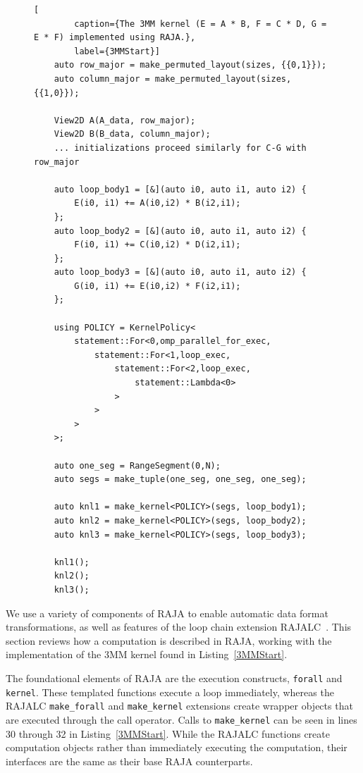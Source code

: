 \documentclass[sigconf,review=true]{acmart}
\begin{document}
\begin{figure}
	\begin{lstlisting}[
		caption={The 3MM kernel (E = A * B, F = C * D, G = E * F) implemented using RAJA.},
		label={3MMStart}]
	auto row_major = make_permuted_layout(sizes, {{0,1}});
	auto column_major = make_permuted_layout(sizes, {{1,0}});

	View2D A(A_data, row_major);
	View2D B(B_data, column_major);
	... initializations proceed similarly for C-G with row_major

	auto loop_body1 = [&](auto i0, auto i1, auto i2) {
		E(i0, i1) += A(i0,i2) * B(i2,i1);
	};
	auto loop_body2 = [&](auto i0, auto i1, auto i2) {
		F(i0, i1) += C(i0,i2) * D(i2,i1);
	};
	auto loop_body3 = [&](auto i0, auto i1, auto i2) {
		G(i0, i1) += E(i0,i2) * F(i2,i1);
	};
	
	using POLICY = KernelPolicy<
		statement::For<0,omp_parallel_for_exec,
			statement::For<1,loop_exec,
				statement::For<2,loop_exec,
					statement::Lambda<0>
				>
			>
		>
	>;

	auto one_seg = RangeSegment(0,N);
	auto segs = make_tuple(one_seg, one_seg, one_seg);

	auto knl1 = make_kernel<POLICY>(segs, loop_body1);
	auto knl2 = make_kernel<POLICY>(segs, loop_body2);
	auto knl3 = make_kernel<POLICY>(segs, loop_body3);

	knl1();
	knl2();
	knl3();
	\end{lstlisting}
\end{figure}


We use a variety of components of RAJA to enable automatic data format transformations, as well as features of the loop chain extension RAJALC~\cite{neth2021inter}. 
This section reviews how a computation is described in RAJA, working with the implementation of the 3MM kernel found in Listing~\ref{3MMStart}.

The foundational elements of RAJA are the execution constructs, \verb.forall. and \verb.kernel.. 
These templated functions execute a loop immediately, whereas the RAJALC \verb.make_forall. and \verb.make_kernel. extensions create wrapper objects that are executed through the call operator. 
Calls to \verb.make_kernel. can be seen in lines 30 through 32 in Listing~\ref{3MMStart}. 
While the RAJALC functions create computation objects rather than immediately executing the computation, their interfaces are the same as their base RAJA counterparts.
\end{document}
